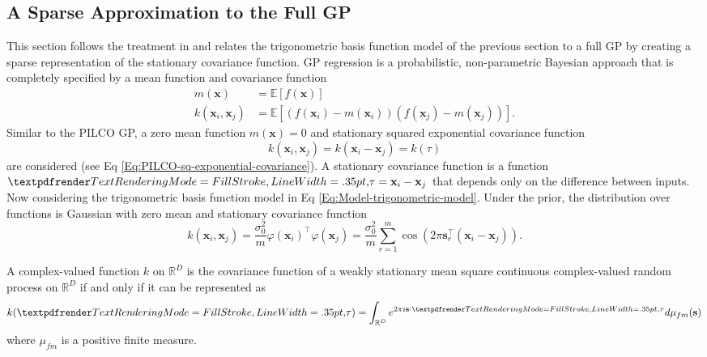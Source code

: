 \subsection{A Sparse Approximation to the Full GP}
\label{S:sparse-approximation}
This section follows the treatment in \cite{quia2010sparse} and relates the trigonometric basis function model of the previous section to a full GP by creating a sparse representation of the stationary covariance function. GP regression is a probabilistic, non-parametric Bayesian approach that is completely specified by a mean function and covariance function \cite{williams2006gaussian}
\begin{equation}
    \begin{aligned} 
    m(\mathbf{x}) 
    &=\mathbb{E}[f(\mathbf{x})] \\ k\left(\mathbf{x}_{i}, \mathbf{x}_{j}\right) &=\mathbb{E}\left[(f(\mathbf{x}_{i})-m(\mathbf{x}_{i}))\left(f\left(\mathbf{x}_{j}\right)-m\left(\mathbf{x}_{j}\right)\right)\right]. 
    \end{aligned}
\end{equation}
Similar to the PILCO GP, a zero mean function $m(\mathbf{x})=0$ and stationary squared exponential covariance function
\begin{equation}
    k\left(\mathbf{x}_{i}, \mathbf{x}_{j}\right)=k\left(\mathbf{x}_{i}-\mathbf{x}_{j}\right)=k(\tau)
    \label{Eq:stationary-covariance-tau}
\end{equation}
are considered (see Eq \ref{Eq:PILCO-sq-exponential-covariance}). A stationary covariance function is a function $\boldgreek{\tau} = \mathbf{x}_{i}-\mathbf{x}_{j}$ that depends only on the difference between inputs. Now considering the trigonometric basis function model in Eq \ref{Eq:Model-trigonometric-model}. Under the prior, the distribution over functions is Gaussian with zero mean and stationary covariance function \cite{quia2010sparse}
\begin{equation}
    k\left(\mathbf{x}_{i}, \mathbf{x}_{j}\right)=\frac{\sigma_{0}^{2}}{m} \varphi\left(\mathbf{x}_{i}\right)^{\top} \varphi\left(\mathbf{x}_{j}\right)=\frac{\sigma_{0}^{2}}{m} \sum_{r=1}^{m} \cos \left(2 \pi \mathbf{s}_{r}^{\top}\left(\mathbf{x}_{i}-\mathbf{x}_{j}\right)\right).
    \label{Eq:phi-to-covariance-relationship}
\end{equation}
\begin{theorem}
\label{T:bochners-theorem}
A complex-valued function $k$ on $\mathbb{R}^{D}$ is the
covariance function of a weakly stationary mean square continuous complex-valued random process on $\mathbb{R}^{D}$ if and only if it can be represented as
\begin{equation}
    k(\boldgreek{\tau})=\int_{\mathbb{R}^{D}} e^{2 \pi i \mathbf{s} \cdot \boldgreek{\tau}} d \mu_{fm}(\mathbf{s})
\end{equation}
where $\mu_{fm}$ is a positive finite measure. 
\end{theorem}
